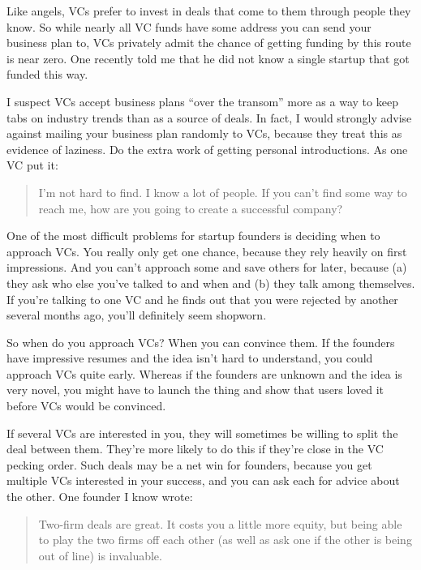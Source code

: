 Like angels, VCs prefer to invest in deals that come to them through
people they know. So while nearly all VC funds have some address you can
send your business plan to, VCs privately admit the chance of getting
funding by this route is near zero. One recently told me that he did not
know a single startup that got funded this way.

I suspect VCs accept business plans ``over the transom'' more as a way
to keep tabs on industry trends than as a source of deals. In fact, I
would strongly advise against mailing your business plan randomly to
VCs, because they treat this as evidence of laziness. Do the extra work
of getting personal introductions. As one VC put it:

\begin{quote}
I'm not hard to find. I know a lot of people. If you can't find some way
to reach me, how are you going to create a successful company?
\end{quote}

One of the most difficult problems for startup founders is deciding when
to approach VCs. You really only get one chance, because they rely
heavily on first impressions. And you can't approach some and save
others for later, because (a) they ask who else you've talked to and
when and (b) they talk among themselves. If you're talking to one VC and
he finds out that you were rejected by another several months ago,
you'll definitely seem shopworn.

So when do you approach VCs? When you can convince them. If the founders
have impressive resumes and the idea isn't hard to understand, you could
approach VCs quite early. Whereas if the founders are unknown and the
idea is very novel, you might have to launch the thing and show that
users loved it before VCs would be convinced.

If several VCs are interested in you, they will sometimes be willing to
split the deal between them. They're more likely to do this if they're
close in the VC pecking order. Such deals may be a net win for founders,
because you get multiple VCs interested in your success, and you can ask
each for advice about the other. One founder I know wrote:

\begin{quote}
Two-firm deals are great. It costs you a little more equity, but being
able to play the two firms off each other (as well as ask one if the
other is being out of line) is invaluable.
\end{quote}

